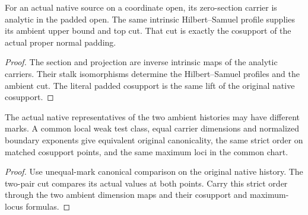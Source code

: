 \begin{theorem}
\label{hir:g1-proper-normal-native-cut}
\leanok
For an actual native source on a coordinate open, its
zero-section carrier is analytic in the padded open.
The same intrinsic Hilbert--Samuel profile supplies its
ambient upper bound and top cut. That cut is exactly the
cosupport of the actual proper normal padding.
\end{theorem}
\begin{proof}
The section and projection are inverse intrinsic maps of
the analytic carriers. Their stalk isomorphisms determine
the Hilbert--Samuel profiles and the ambient cut. The
literal padded cosupport is the same lift of the original
native cosupport.
\end{proof}

\begin{theorem}
\label{hir:g1-cross-ambient-native-class-comparison}
\leanok
The actual native representatives of the two ambient
histories may have different marks. A common local weak
test class, equal carrier dimensions and normalized
boundary exponents give equivalent original canonicality,
the same strict order on matched cosupport points, and
the same maximum loci in the common chart.
\end{theorem}
\begin{proof}
Use unequal-mark canonical comparison on the original
native history. The two-pair cut compares its actual
values at both points. Carry this strict order through
the two ambient dimension maps and their cosupport
and maximum-locus formulas.
\end{proof}

